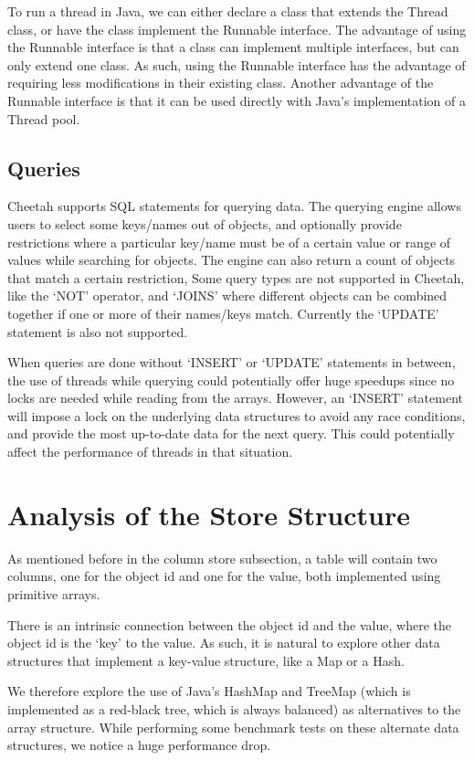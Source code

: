 \documentclass[11pt,journal,compsoc]{IEEEtran}
\begin{document}
To run a thread in Java, we can either declare a class that extends the Thread class, or have the class implement the Runnable interface. The advantage of using the Runnable interface is that a class can implement multiple interfaces, but can only extend one class. As such, using the Runnable interface has the advantage of requiring less modifications in their existing class. Another advantage of the Runnable interface is that it can be used directly with Java’s implementation of a Thread pool. 

\subsection{Queries}

Cheetah supports SQL statements for querying data. The querying engine allows users to select some keys/names out of objects, and optionally provide  restrictions where a particular key/name must be of a certain value or range of values while searching for objects. The engine can also return a count of objects that match a certain restriction, Some query types are not supported in Cheetah, like the ‘NOT’ operator, and ‘JOINS’ where different objects can be combined together if one or more of their names/keys match. Currently the ‘UPDATE’ statement is also not supported.


When queries are done without ‘INSERT’ or ‘UPDATE’ statements in between, the use of threads while querying could potentially offer huge speedups since no locks are needed while reading from the arrays. However, an ‘INSERT’ statement will impose a lock on the underlying data structures to avoid any race conditions, and provide the most up-to-date data for the next query. This could potentially affect the performance of threads in that situation.


\section{Analysis of the Store Structure}
As mentioned before in the column store subsection, a table will contain two columns, one for the object id and one for the value, both implemented using primitive arrays.

There is an intrinsic connection between the object id and the value, where the object id is the ‘key’ to the value. As such, it is natural to explore other data structures that implement a key-value structure, like a Map or a Hash.

We therefore explore the use of Java’s HashMap and TreeMap (which is implemented as a red-black tree, which is always balanced) as alternatives to the array structure. While performing some benchmark tests on these alternate data structures, we notice a huge performance drop.
\end{document}
